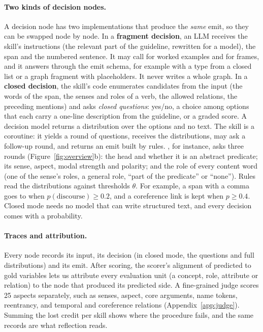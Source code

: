 \paragraph{Two kinds of decision nodes.}
\label{sec:decisions}
A decision node has two implementations that produce the \emph{same} emit, so they can be swapped node by node. In a \textbf{fragment decision}, an LLM receives the skill's instructions (the relevant part of the guideline, rewritten for a model), the span and the numbered sentence. It may call  for worked examples and  for frames, and it answers through the emit schema, for example with a type from a closed list or a graph fragment with placeholders. It never writes a whole graph.
In a \textbf{closed decision}, the skill's code enumerates candidates from the input (the words of the span, the senses and roles of a verb, the allowed relations, the preceding mentions) and asks \emph{closed questions}: yes/no, a choice among options that each carry a one-line description from the guideline, or a graded score. A decision model returns a distribution over the options and no text. The skill is a coroutine: it yields a round of questions, receives the distributions, may ask a follow-up round, and returns an emit built by rules. , for instance, asks three rounds (Figure~\ref{fig:overview}b): the head and whether it is an abstract predicate; its sense, aspect, modal strength and polarity; and the role of every content word (one of the sense's roles, a general role, ``part of the predicate'' or ``none''). Rules read the distributions against thresholds $\theta$. For example, a span with a comma goes to  when $p(\text{discourse})\geq 0.2$, and a coreference link is kept when $p\geq 0.4$. Closed mode needs no model that can write structured text, and every decision comes with a probability.

\paragraph{Traces and attribution.}
\label{sec:trace}
Every node records its input, its decision (in closed mode, the questions and full distributions) and its emit. After scoring, the scorer's alignment of predicted to gold variables lets us attribute every evaluation unit (a concept, role, attribute or relation) to the node that produced its predicted side. A fine-grained judge scores 25 aspects separately, such as senses, aspect, core arguments, name tokens, reentrancy, and temporal and coreference relations (Appendix~\ref{app:judge}). Summing the lost credit per skill shows where the procedure fails, and the same records are what reflection reads.
